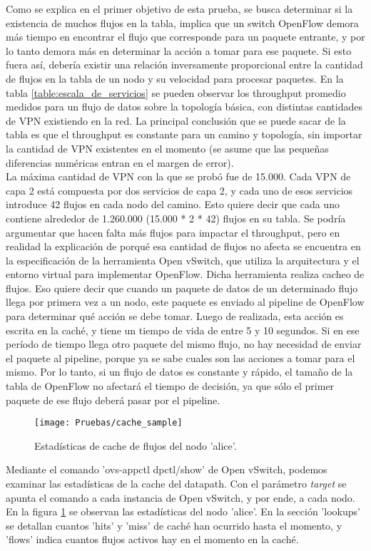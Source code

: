 Como se explica en el primer objetivo de esta prueba, se busca determinar si la existencia de muchos flujos en la tabla, implica que un switch OpenFlow demora más tiempo en encontrar el flujo que corresponde para un paquete entrante, y por lo tanto demora más en determinar la acción a tomar para ese paquete. Si esto fuera así, debería existir una relación inversamente proporcional entre la cantidad de flujos en la tabla de un nodo y su velocidad para procesar paquetes. En la tabla \ref{table:escala_de_servicios} se pueden observar los throughput promedio medidos para un flujo de datos sobre la topología básica, con distintas cantidades de VPN existiendo en la red. La principal conclusión que se puede sacar de la tabla es que el throughput es constante para un camino y topología, sin importar la cantidad de VPN existentes en el momento (se asume que las pequeñas diferencias numéricas entran en el margen de error). \\
La máxima cantidad de VPN con la que se probó fue de 15.000. Cada VPN de capa 2 está compuesta por dos servicios de capa 2, y cada uno de esos servicios introduce 42 flujos en cada nodo del camino. Esto quiere decir que cada uno contiene alrededor de 1.260.000 (15.000 * 2 * 42) flujos en su tabla. Se podría argumentar que hacen falta más flujos para impactar el throughput, pero en realidad la explicación de porqué esa cantidad de flujos no afecta se encuentra en la especificación de la herramienta Open vSwitch, que utiliza la arquitectura y el entorno virtual para implementar OpenFlow. Dicha herramienta realiza cacheo de flujos. Eso quiere decir que cuando un paquete de datos de un determinado flujo llega por primera vez a un nodo, este paquete es enviado al pipeline de OpenFlow para determinar qué acción se debe tomar. Luego de realizada, esta acción es escrita en la caché, y tiene un tiempo de vida de entre 5 y 10 segundos. Si en ese período de tiempo llega otro paquete del mismo flujo, no hay necesidad de enviar el paquete al pipeline, porque ya se sabe cuales son las acciones a tomar para el mismo. Por lo tanto, si un flujo de datos es constante y rápido, el tamaño de la tabla de OpenFlow no afectará el tiempo de decisión, ya que sólo el primer paquete de ese flujo deberá pasar por el pipeline. \\
\begin{figure}[t]
	\caption{Estadísticas de cache de flujos del nodo 'alice'.}
	\texttt{[image: Pruebas/cache\_sample]}
	\centering
	\label{fig:cache_sample}
\end{figure}
Mediante el comando 'ovs-appctl dpctl/show' de Open vSwitch, podemos examinar las estadísticas de la cache del datapath. Con el parámetro \textit{target} se apunta el comando a cada instancia de Open vSwitch, y por ende, a cada nodo. En la figura \ref{fig:cache_sample} se observan las estadísticas del nodo 'alice'. En la sección 'lookups' se detallan cuantos 'hits' y 'miss' de caché han ocurrido hasta el momento, y 'flows' indica cuantos flujos activos hay en el momento en la caché. \\

